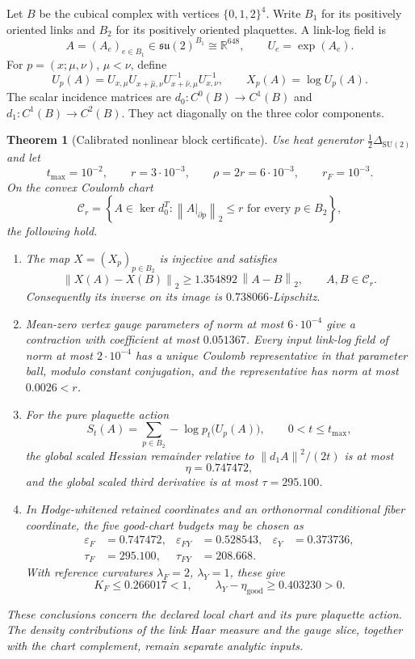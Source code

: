 \documentclass[11pt]{article}
\newtheorem{theorem}{Theorem}[section]
\theoremstyle{definition}
\newcommand{\SU}{\mathrm{SU}(2)}
\newcommand{\su}{\mathfrak{su}(2)}
\newcommand{\R}{\mathbb{R}}
\newcommand{\norm}[1]{\left\lVert #1\right\rVert}
\begin{document}
Let $B$ be the cubical complex with vertices $\{0,1,2\}^4$.  Write $B_1$ for
its positively oriented links and $B_2$ for its positively oriented
plaquettes.  A link-log field is
\[
 A=(A_e)_{e\in B_1}\in \su^{B_1}\cong\R^{648},
 \qquad U_e=\exp(A_e).
\]
For $p=(x;\mu,\nu)$, $\mu<\nu$, define
\begin{equation}\label{eq:holonomy}
 U_p(A)=U_{x,\mu}U_{x+\hat\mu,\nu}
 U_{x+\hat\nu,\mu}^{-1}U_{x,\nu}^{-1},
 \qquad X_p(A)=\log U_p(A).
\end{equation}
The scalar incidence matrices are $d_0:C^0(B)\to C^1(B)$ and
$d_1:C^1(B)\to C^2(B)$.  They act diagonally on the three color components.

\begin{theorem}[Calibrated nonlinear block certificate]\label{thm:main}
Use heat generator $\frac12\Delta_{\SU}$ and let
\[
 t_{\max}=10^{-2},\qquad r=3\cdot10^{-3},\qquad
 \rho=2r=6\cdot10^{-3},\qquad r_F=10^{-3}.
\]
On the convex Coulomb chart
\[
 \mathcal C_r=\left\{A\in\ker d_0^T:
   \norm{A|_{\partial p}}_2\le r\text{ for every }p\in B_2\right\},
\]
the following hold.
\begin{enumerate}
\item The map $X=(X_p)_{p\in B_2}$ is injective and satisfies
\[
 \norm{X(A)-X(B)}_2\ge 1.354892\,\norm{A-B}_2,
 \qquad A,B\in\mathcal C_r.
\]
Consequently its inverse on its image is $0.738066$-Lipschitz.
\item Mean-zero vertex gauge parameters of norm at most $6\cdot10^{-4}$
give a contraction with coefficient at most $0.051367$.  Every input link-log
field of norm at most $2\cdot10^{-4}$ has a unique Coulomb representative in
that parameter ball, modulo constant conjugation, and the representative has
norm at most $0.0026<r$.
\item For the pure plaquette action
\[
 S_t(A)=\sum_{p\in B_2}-\log p_t\bigl(U_p(A)\bigr),
 \qquad 0<t\le t_{\max},
\]
the global scaled Hessian remainder relative to
$\norm{d_1A}^2/(2t)$ is at most
\[
 \eta=0.747472,
\]
and the global scaled third derivative is at most
$\tau=295.100$.
\item In Hodge-whitened retained coordinates and an orthonormal conditional
fiber coordinate, the five good-chart budgets may be chosen as
\begin{align*}
 \varepsilon_F&=0.747472,&
 \varepsilon_{FY}&=0.528543,&
 \varepsilon_Y&=0.373736,\\
 \tau_F&=295.100,&
 \tau_{FY}&=208.668.
\end{align*}
With reference curvatures $\lambda_F=2$, $\lambda_Y=1$, these give
\[
 K_F\le0.266017<1,
 \qquad
 \lambda_Y-\eta_{\mathrm{good}}\ge0.403230>0.
\]
\end{enumerate}
These conclusions concern the declared local chart and its pure plaquette
action.  The density contributions of the link Haar measure and the gauge
slice, together with the chart complement, remain separate analytic inputs.
\end{theorem}
\end{document}
